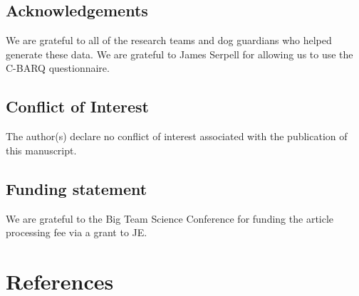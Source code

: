 \documentclass[
  man,floatsintext]{apa6}
\begin{document}
\hypertarget{acknowledgements}{%
\subsection{Acknowledgements}\label{acknowledgements}}

We are grateful to all of the research teams and dog guardians who helped generate these data. We are grateful to James Serpell for allowing us to use the C-BARQ questionnaire.

\hypertarget{conflict-of-interest}{%
\subsection{Conflict of Interest}\label{conflict-of-interest}}

The author(s) declare no conflict of interest associated with the publication of this manuscript.

\hypertarget{funding-statement}{%
\subsection{Funding statement}\label{funding-statement}}

We are grateful to the Big Team Science Conference for funding the article processing fee via a grant to JE.

\newpage

\hypertarget{references}{%
\section{References}\label{references}}
\end{document}
